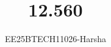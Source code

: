 \documentclass[journal]{IEEEtran}
\begin{document}

\vspace{3cm}

\title{12.560}
\author{EE25BTECH11026-Harsha}
 \maketitle
{\let\newpage\relax\maketitle}

\renewcommand{\thefigure}{\theenumi}
\renewcommand{\thetable}{\theenumi}
\setlength{\intextsep}{10pt} %


\renewcommand{\thetable}{\theenumi}
\end{document}
